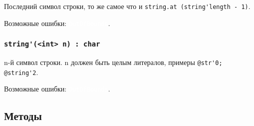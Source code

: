 \documentclass[a4paper, 14pt]{extarticle}
\newcommand{\ferror}[1]{{\fontsize{11pt}{12pt} \tt \colorbox{function}{\textcolor{white}{#1}}}}
\begin{document}
Последний символ строки, то же самое что и \lstinline|string.at (string'length - 1)|.

Возможные ошибки: \ferror{OutOfBounds}.

\subsubsection{\lstinline|string'(<int> n) : char|}

n-й символ строки. n должен быть целым литералов, примеры \lstinline|@str'0; @string'2|.

Возможные ошибки: \ferror{OutOfBounds}.

\subsection{Методы}
\end{document}
